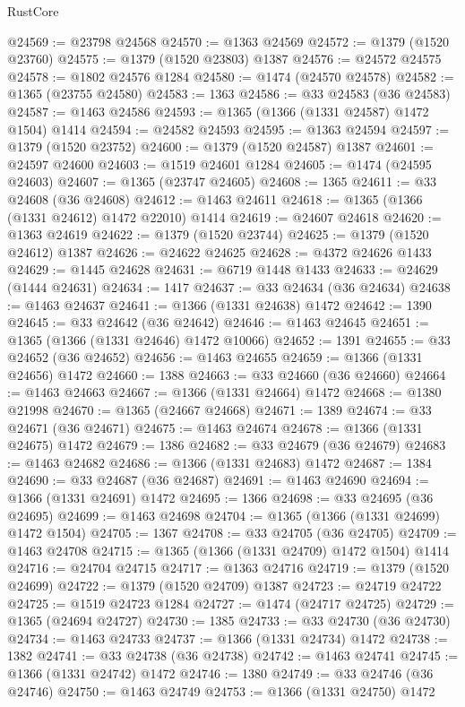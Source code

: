 \begin{lexlean}{RustCore}
\begin{coremodule}
@24569 := @23798 @24568
@24570 := @1363 @24569
@24572 := @1379 (@1520 @23760)
@24575 := @1379 (@1520 @23803) @1387
@24576 := @24572 @24575
@24578 := @1802 @24576 @1284
@24580 := @1474 (@24570 @24578)
@24582 := @1365 (@23755 @24580)
@24583 := 1363
@24586 := @33 @24583 (@36 @24583)
@24587 := @1463 @24586
@24593 := @1365 (@1366 (@1331 @24587) @1472 @1504) @1414
@24594 := @24582 @24593
@24595 := @1363 @24594
@24597 := @1379 (@1520 @23752)
@24600 := @1379 (@1520 @24587) @1387
@24601 := @24597 @24600
@24603 := @1519 @24601 @1284
@24605 := @1474 (@24595 @24603)
@24607 := @1365 (@23747 @24605)
@24608 := 1365
@24611 := @33 @24608 (@36 @24608)
@24612 := @1463 @24611
@24618 := @1365 (@1366 (@1331 @24612) @1472 @22010) @1414
@24619 := @24607 @24618
@24620 := @1363 @24619
@24622 := @1379 (@1520 @23744)
@24625 := @1379 (@1520 @24612) @1387
@24626 := @24622 @24625
@24628 := @4372 @24626 @1433
@24629 := @1445 @24628
@24631 := @6719 @1448 @1433
@24633 := @24629 (@1444 @24631)
@24634 := 1417
@24637 := @33 @24634 (@36 @24634)
@24638 := @1463 @24637
@24641 := @1366 (@1331 @24638) @1472
@24642 := 1390
@24645 := @33 @24642 (@36 @24642)
@24646 := @1463 @24645
@24651 := @1365 (@1366 (@1331 @24646) @1472 @10066)
@24652 := 1391
@24655 := @33 @24652 (@36 @24652)
@24656 := @1463 @24655
@24659 := @1366 (@1331 @24656) @1472
@24660 := 1388
@24663 := @33 @24660 (@36 @24660)
@24664 := @1463 @24663
@24667 := @1366 (@1331 @24664) @1472
@24668 := @1380 @21998
@24670 := @1365 (@24667 @24668)
@24671 := 1389
@24674 := @33 @24671 (@36 @24671)
@24675 := @1463 @24674
@24678 := @1366 (@1331 @24675) @1472
@24679 := 1386
@24682 := @33 @24679 (@36 @24679)
@24683 := @1463 @24682
@24686 := @1366 (@1331 @24683) @1472
@24687 := 1384
@24690 := @33 @24687 (@36 @24687)
@24691 := @1463 @24690
@24694 := @1366 (@1331 @24691) @1472
@24695 := 1366
@24698 := @33 @24695 (@36 @24695)
@24699 := @1463 @24698
@24704 := @1365 (@1366 (@1331 @24699) @1472 @1504)
@24705 := 1367
@24708 := @33 @24705 (@36 @24705)
@24709 := @1463 @24708
@24715 := @1365 (@1366 (@1331 @24709) @1472 @1504) @1414
@24716 := @24704 @24715
@24717 := @1363 @24716
@24719 := @1379 (@1520 @24699)
@24722 := @1379 (@1520 @24709) @1387
@24723 := @24719 @24722
@24725 := @1519 @24723 @1284
@24727 := @1474 (@24717 @24725)
@24729 := @1365 (@24694 @24727)
@24730 := 1385
@24733 := @33 @24730 (@36 @24730)
@24734 := @1463 @24733
@24737 := @1366 (@1331 @24734) @1472
@24738 := 1382
@24741 := @33 @24738 (@36 @24738)
@24742 := @1463 @24741
@24745 := @1366 (@1331 @24742) @1472
@24746 := 1380
@24749 := @33 @24746 (@36 @24746)
@24750 := @1463 @24749
@24753 := @1366 (@1331 @24750) @1472

\end{coremodule}
\end{lexlean}
